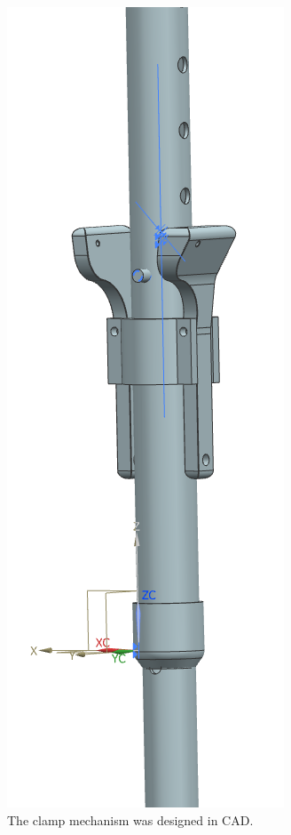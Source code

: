 \begin{figure}
    \centering
    \includegraphics[width=0.8\columnwidth]{Appendix/LAM/Zangenassembly.png}
    \caption{The clamp mechanism was designed in CAD.}
    \label{fig:CAD_LAM}
\end{figure}
